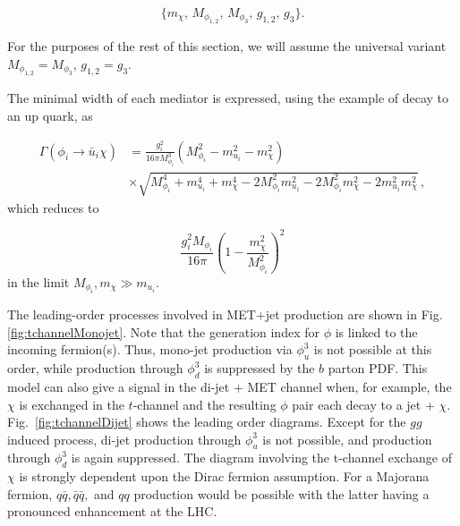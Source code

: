 \begin{equation}
\{ m_{\chi},\, M_{\phi_{1,2}},\,M_{\phi_3},\, g_{1,2},\, g_3\}.
\end{equation}

For the purposes of the rest of this section, we will assume the universal variant $M_{\phi_{1,2}} = M_{\phi_3}$, $g_{1,2} = g_3$.

\vspace{5mm}

The minimal width of each mediator is expressed, using the example of decay to an up quark, as

\begin{equation}
\begin{split}
\Gamma (\phi_i \rightarrow \bar{u}_i \chi) &= \frac{g_i^2}{16 \pi M_{\phi_i}^3}(M_{\phi_i}^2 - m_{u_i}^2 - m_{\chi}^2) 		\\
					   & \times \sqrt{M_{\phi_i}^4 + m_{u_i}^4 + m_{\chi}^4 - 2M_{\phi_i}^2m_{u_i}^2 - 2M_{\phi_i}^2m_{\chi}^2 - 2m_{u_i}^2m_{\chi}^2} \, ,
\end{split}
\end{equation}
which reduces to 

\begin{equation}
\frac{g_i^2 M_{\phi_i}}{16 \pi} \left(1 - \frac{m_{\chi}^2}{M_{\phi_i}^2} \right)^2
\end{equation}
in the limit $M_{\phi_i}, m_{\chi} \gg m_{u_i}$.

\vspace{5mm}

The leading-order processes involved in MET+jet production are shown
in Fig. \ref{fig:tchannelMonojet}.
Note that the generation index for $\phi$ is linked to the incoming
fermion(s).   Thus, mono-jet production via $\phi^3_u$ is not possible at
this order, while production through $\phi^3_d$ is suppressed by
the $b$ parton PDF.
This model can also give a signal in the di-jet +
MET channel when, for example, the $\chi$ is exchanged in the
$t$-channel and the resulting $\phi$ pair each decay to a jet +
$\chi$. Fig.~\ref{fig:tchannelDijet} shows the leading order diagrams.
Except for the $gg$ induced process, di-jet production
through $\phi^3_u$ is not possible, and production through $\phi^3_d$ is
again suppressed.   The diagram involving the t-channel exchange
of $\chi$ is strongly dependent upon the Dirac fermion assumption.
For a Majorana fermion, $q\bar q,\bar q\bar q,$ and $qq$ production
would be possible with the latter having a pronounced enhancement
at the LHC.


